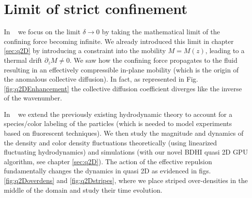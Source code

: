 \documentclass[ twoside,openright,titlepage,numbers=noenddot,%
headinclude,footinclude,cleardoublepage=empty,abstract=on,
BCOR=5mm,paper=b5,fontsize=11pt, dvipsnames
]{scrreprt}
\newcommand{\gpu}{\gls{GPU}\xspace}
\begin{document}

\section{Limit of strict confinement}\label{sec:strictconf}
In ~\cite{Pelaez2018} we focus on the limit $\delta\rightarrow 0$ by taking the mathematical limit of the confining force becoming infinite. We already introduced this limit in chapter \ref{sec:q2D} by introducing a constraint into the mobility $M=M(z)$, leading to a thermal drift $\partial_zM\neq 0$. We saw how the confining force propagates to the fluid resulting in an effectively compressible in-plane mobility (which is the origin of the anomalous collective diffusion). In fact, as represented in Fig. \ref{fig:q2DEnhancement} the collective diffusion coefficient diverges like the inverse of the wavenumber.

In ~\cite{Pelaez2018} we extend the previously existing hydrodynamic theory to account for a species/color labeling of the particles (which is needed to model experiments based on fluorescent techniques). We then study the magnitude and dynamics of the density and color density fluctuations theoretically (using linearized fluctuating hydrodynamics) and simulations (with our novel \gls{BDHI} quasi 2D \gpu algorithm, see chapter \ref{sec:q2D}).
The action of the effective repulsion fundamentally changes the dynamics in quasi 2D as evidenced in figs. \ref{fig:q2Doverdens} and \ref{fig:q2Dstripes}, where we place striped over-densities in the middle of the domain and study their time evolution.
\end{document}
